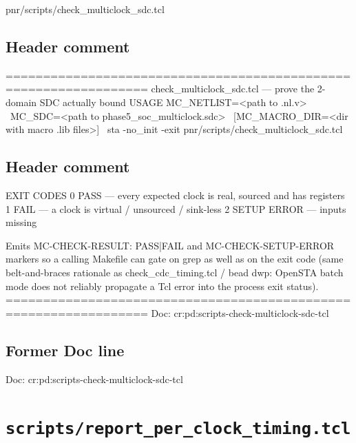 \begin{relocated}{pnr/scripts/check_multiclock_sdc.tcl}

\subsection*{Header comment}

\begin{textblock}
=================================================================
check_multiclock_sdc.tcl — prove the 2-domain SDC actually bound
USAGE
  MC_NETLIST=<path to .nl.v>  \
  MC_SDC=<path to phase5_soc_multiclock.sdc> \
  [MC_MACRO_DIR=<dir with macro .lib files>] \
    sta -no_init -exit pnr/scripts/check_multiclock_sdc.tcl
\end{textblock}

\subsection*{Header comment}

\begin{textblock}
EXIT CODES
  0  PASS — every expected clock is real, sourced and has registers
  1  FAIL — a clock is virtual / unsourced / sink-less
  2  SETUP ERROR — inputs missing

Emits MC-CHECK-RESULT: PASS|FAIL and MC-CHECK-SETUP-ERROR markers so a
calling Makefile can gate on grep as well as on the exit code (same
belt-and-braces rationale as check_cdc_timing.tcl / bead dwp: OpenSTA
batch mode does not reliably propagate a Tcl error into the process
exit status).
=================================================================
Doc: cr:pd:scripts-check-multiclock-sdc-tcl
\end{textblock}

\subsection*{Former Doc line}

\begin{textblock}
Doc: cr:pd:scripts-check-multiclock-sdc-tcl
\end{textblock}

\end{relocated}

\section{\texttt{scripts/report\_per\_clock\_timing.tcl}}\label{tm:pd:scripts-report-per-clock-timing-tcl}


